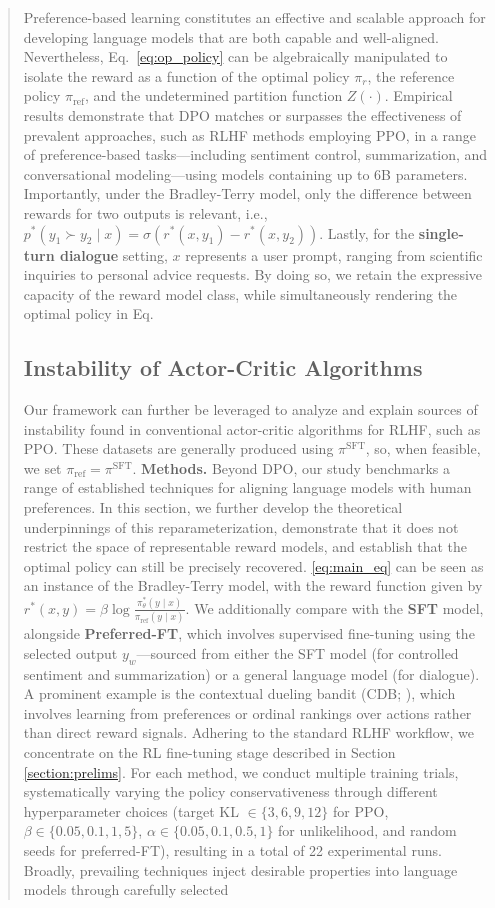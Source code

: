 \begin{abstract}
\begin{sproof}
Preference-based learning constitutes an effective and scalable approach for developing language models that are both capable and well-aligned. Nevertheless, Eq.~\ref{eq:op_policy} can be algebraically manipulated to isolate the reward as a function of the optimal policy $\pi_r$, the reference policy $\pi_\text{ref}$, and the undetermined partition function $Z(\cdot)$. Empirical results demonstrate that DPO matches or surpasses the effectiveness of prevalent approaches, such as RLHF methods employing PPO, in a range of preference-based tasks—including sentiment control, summarization, and conversational modeling—using models containing up to 6B parameters. Importantly, under the Bradley-Terry model, only the difference between rewards for two outputs is relevant, i.e., ${p^*(y_1 \succ y_2 \mid x) = \sigma(r^*(x, y_1) - r^*(x, y_2))}$. Lastly, for the \textbf{single-turn dialogue} setting, $x$ represents a user prompt, ranging from scientific inquiries to personal advice requests. By doing so, we retain the expressive capacity of the reward model class, while simultaneously rendering the optimal policy in Eq. \subsection{Instability of Actor-Critic Algorithms} Our framework can further be leveraged to analyze and explain sources of instability found in conventional actor-critic algorithms for RLHF, such as PPO. These datasets are generally produced using $\pi^\text{SFT}$, so, when feasible, we set $\pi_\text{ref} = \pi^\text{SFT}$. \textbf{Methods.} Beyond DPO, our study benchmarks a range of established techniques for aligning language models with human preferences. In this section, we further develop the theoretical underpinnings of this reparameterization, demonstrate that it does not restrict the space of representable reward models, and establish that the optimal policy can still be precisely recovered. \ref{eq:main_eq} can be seen as an instance of the Bradley-Terry model, with the reward function given by $r^*(x, y) = \beta \log\frac{\pi^*_\theta(y \mid x)}{\pi_\text{ref}(y \mid x)}$. We additionally compare with the \textbf{SFT} model, alongside \textbf{Preferred-FT}, which involves supervised fine-tuning using the selected output $y_w$—sourced from either the SFT model (for controlled sentiment and summarization) or a general language model (for dialogue). A prominent example is the contextual dueling bandit (CDB; \cite{yue2012karmed,dudik2015contextual}), which involves learning from preferences or ordinal rankings over actions rather than direct reward signals. Adhering to the standard RLHF workflow, we concentrate on the RL fine-tuning stage described in Section \ref{section:prelims}. For each method, we conduct multiple training trials, systematically varying the policy conservativeness through different hyperparameter choices (target KL $\in\{3,6,9,12\}$ for PPO, $\beta \in \{0.05,0.1,1,5\}$, $\alpha\in\{0.05,0.1,0.5,1\}$ for unlikelihood, and random seeds for preferred-FT), resulting in a total of 22 experimental runs. Broadly, prevailing techniques inject desirable properties into language models through carefully selected 
\end{sproof}
\end{abstract}
